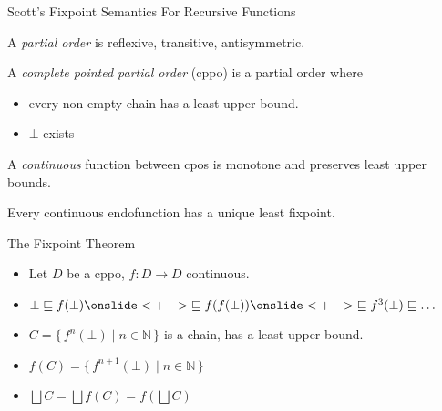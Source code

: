\documentclass{beamer}
\newcommand{\below}{\sqsubseteq}
\newcommand{\set}[1]{\{\,#1\,\}}
\newcommand{\bbN}{\mathbb{N}}
\newcommand{\lub}{\bigsqcup}
\newcommand{\arr}{\rightarrow}
\begin{document}
\begin{frame}{Scott's Fixpoint Semantics For Recursive Functions}

\begin{definition}
A \emph{partial order} is reflexive, transitive, antisymmetric.
\end{definition}

\begin{definition}
A \emph{complete pointed partial order} (cppo) is a partial order where
\begin{itemize}
\item every non-empty chain has a least upper bound.
\item $\bot$ exists
\end{itemize}
\end{definition}

\begin{definition}
A \emph{continuous} function between cpos is monotone and preserves least upper bounds.
\end{definition}

\begin{theorem}
Every continuous endofunction has a unique least fixpoint.
\end{theorem}

\end{frame}



\begin{frame}{The Fixpoint Theorem}

\begin{itemize} \itemsep0.5em
\onslide<+->
\item Let $D$ be a cppo, $f : D \arr D$ continuous.

\item $\bot \below f(\bot)
   \onslide<+->{ \below f(f(\bot))}
   \onslide<+->{\below f^3(\bot) \below \ldots}$

\onslide<+->
\item $C = \set{f^n(\bot) \mid n \in \bbN}$ is a chain, has a least upper bound.

\onslide<+->
\item $f(C) = \set{f^{n+1}(\bot) \mid n \in \bbN}$

\onslide<+->
\item $\lub C = \lub f(C) = f(\lub C)$

\end{itemize}

\end{frame}
\end{document}
